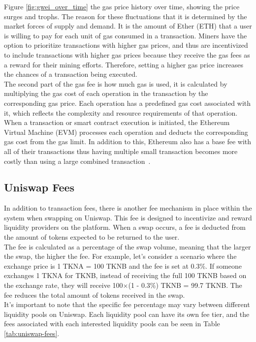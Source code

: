 \noindent Figure \ref{fig:gwei_over_time} the gas price history over time, showing the price surges and trophs. The reason for these fluctuations that it is determined by the market forces of supply and demand. It is the amount of Ether (ETH) that a user is willing to pay for each unit of gas consumed in a transaction. Miners have the option to prioritize transactions with higher gas prices, and thus are incentivized to include transactions with higher gas prices because they receive the gas fees as a reward for their mining efforts. Therefore, setting a higher gas price increases the chances of a transaction being executed.
\\[3mm]
The second part of the gas fee is how much gas is used, it is calculated by multiplying the gas cost of each operation in the transaction by the corresponding gas price. Each operation has a predefined gas cost associated with it, which reflects the complexity and resource requirements of that operation. When a transaction or smart contract execution is initiated, the Ethereum Virtual Machine (EVM) processes each operation and deducts the corresponding gas cost from the gas limit. In addition to this, Ethereum also has a base fee with all of their transactions thus having multiple small transaction becomes more costly than using a large combined transaction~\cite{noauthor_gas_nodate}.

\subsection{Uniswap Fees}
In addition to transaction fees, there is another fee mechanism in place within the system when swapping on Uniswap. This fee is designed to incentivize and reward liquidity providers on the platform. When a swap occurs, a fee is deducted from the amount of tokens expected to be returned to the user.
\\[3mm]
The fee is calculated as a percentage of the swap volume, meaning that the larger the swap, the higher the fee. For example, let's consider a scenario where the exchange price is 1 TKNA = 100 TKNB and the fee is set at 0.3\%. If someone exchanges 1 TKNA for TKNB, instead of receiving the full 100 TKNB based on the exchange rate, they will receive 100$\times$(1 - 0.3\%) TKNB = 99.7 TKNB. The fee reduces the total amount of tokens received in the swap.
\\[3mm]
It's important to note that the specific fee percentage may vary between different liquidity pools on Uniswap. Each liquidity pool can have its own fee tier, and the fees associated with each interested liquidity pools can be seen in Table \ref{tab:uniswap-fees}.

